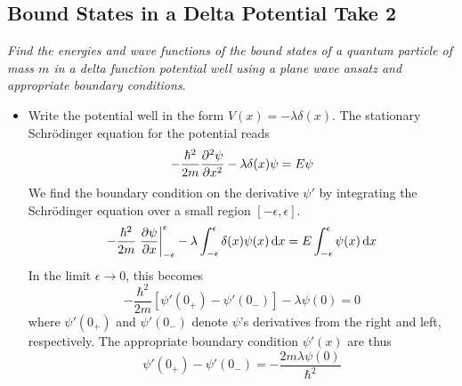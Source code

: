\documentclass[11pt, a4paper]{article}
\newcommand{\diff}{\mathop{}\!\mathrm{d}} %
\newcommand{\Schro}{Schr\"{o}dinger\xspace}
\begin{document}
\subsection{Bound States in a Delta Potential Take 2}
\textit{Find the energies and wave functions of the bound states of a quantum particle of mass $ m $ in a delta function potential well using a plane wave ansatz and appropriate boundary conditions}. 
\begin{itemize}
	\item Write the potential well in the form $ V(x) = - \lambda \delta (x) $. The stationary \Schro equation for the potential reads
	\begin{equation*}
		- \frac{\hbar^{2}}{2m}\pdv[2]{\psi}{x} - \lambda \delta(x) \psi = E\psi
	\end{equation*}
	We find the boundary condition on the derivative $ \psi' $ by integrating the \Schro equation over a small region $ [-\epsilon, \epsilon] $. 
	\begin{equation*}
		-\frac{\hbar^{2}}{2m} \eval{\pdv{\psi}{x}}_{-\epsilon}^{\epsilon} - \lambda \int_{-\epsilon}^{\epsilon} \delta(x) \psi(x)\diff x = E \int_{-\epsilon}^{\epsilon}\psi(x) \diff x
	\end{equation*}
	In the limit $ \epsilon \to 0 $, this becomes
	\begin{equation*}
		-\frac{\hbar^{2}}{2m} \left[\psi'(0_{+}) - \psi'(0_{-})\right] - \lambda \psi(0) = 0
	\end{equation*}
	where $ \psi'(0_{+}) $ and $ \psi'(0_{-}) $ denote $ \psi $'s derivatives from the right and left, respectively. The appropriate boundary condition $ \psi'(x) $ are thus
	\begin{equation*}
		\psi'(0_{+}) - \psi'(0_{-}) = -\frac{2m\lambda\psi(0)}{\hbar^{2}}
	\end{equation*}
	

\end{itemize}
\end{document}
